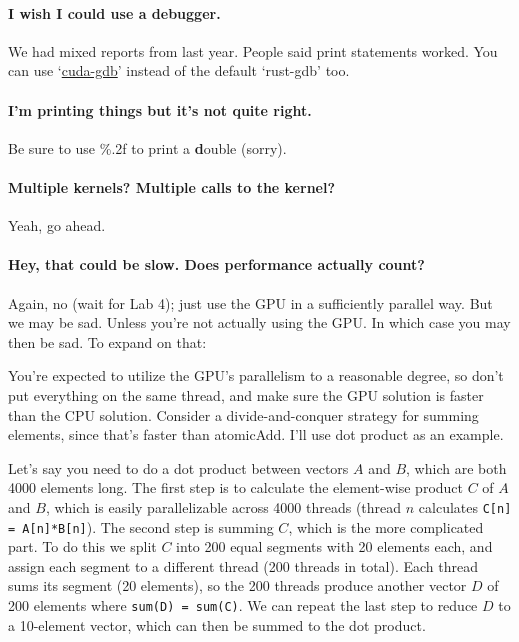 \paragraph{I wish I could use a debugger.} We had mixed reports from last year. People said print statements worked. You can use `\href{https://docs.nvidia.com/cuda/cuda-gdb/index.html}{cuda-gdb}' instead of the default `rust-gdb' too.

\paragraph{I'm printing things but it's not quite right.} Be sure to use \%.2f to print a \textbf{d}ouble (sorry).

\paragraph{Multiple kernels? Multiple calls to the kernel?} Yeah, go ahead.

\paragraph{Hey, that could be slow. Does performance actually count?} Again, no (wait for Lab 4); just use the GPU in a sufficiently parallel way. But we may be sad. Unless you're not actually using the GPU. In which case you may then be sad. To expand on that:

You're expected to utilize the GPU's parallelism to a reasonable degree, so don't put everything on the same thread, and make sure the GPU solution is faster than the CPU solution. Consider a divide-and-conquer strategy for summing elements, since that's faster than atomicAdd. I'll use dot product as an example.

Let's say you need to do a dot product between vectors $A$ and $B$, which are both 4000 elements long. The first step is to calculate the element-wise product $C$ of $A$ and $B$, which is easily parallelizable across 4000 threads (thread $n$ calculates \texttt{C[n] = A[n]*B[n]}). The second step is summing $C$, which is the more complicated part. To do this we split $C$ into 200 equal segments with 20 elements each, and assign each segment to a different thread (200 threads in total). Each thread sums its segment (20 elements), so the 200 threads produce another vector $D$ of 200 elements where \texttt{sum(D) = sum(C)}. We can repeat the last step to reduce $D$ to a 10-element vector, which can then be summed to the dot product.

